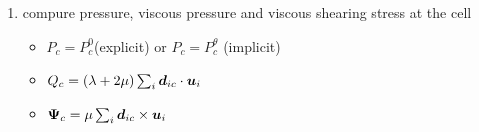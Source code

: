 \documentclass[11pt]{article}
\def\bbf#1{\mathchoice{\hbox{\boldmath$\displaystyle#1$}}
{\hbox{\boldmath$\textstyle#1$}} {\hbox{\boldmath$\scriptstyle#1$}} {\hbox{\boldmath$\scriptscriptstyle#1$}} }
\newcommand{\ui}{\bbf{u}_i}
\newcommand{\Vc}{V_c}
\newcommand{\pc}{P_c}
\newcommand{\qc}{Q_c}
\newcommand{\psic}{\bbf{\Psi}_c}
\newcommand{\dic}{\bbf{d}_{ic}}
\begin{document}
\begin{enumerate}

\item compure pressure, viscous pressure and viscous shearing stress at the cell
\begin{itemize}
    \item $\pc = P_c^0$(explicit) or $\pc = P_c^{\theta}$ (implicit)
    \item $\qc = (\lambda + 2\mu)\sum_i \dic \cdot \ui$
    \item $\psic = \mu \sum_i \dic \times \ui $
\end{itemize}


\end{enumerate}
\end{document}
